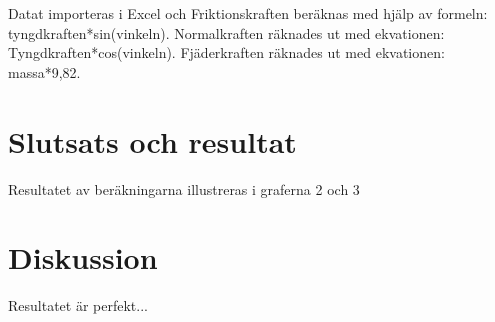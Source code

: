 \documentclass[11p, titlepage, oneside, a4paper]{article}
\begin{document}
    Datat importeras i Excel och Friktionskraften beräknas med hjälp av formeln: tyngdkraften*sin(vinkeln). Normalkraften räknades ut med ekvationen: Tyngdkraften*cos(vinkeln). Fjäderkraften räknades ut med ekvationen: massa*9,82.

    \section{Slutsats och resultat}
    Resultatet av beräkningarna illustreras i graferna 2 och 3
    \section{Diskussion}
    Resultatet är perfekt...


    \printbibliography
\end{document}
